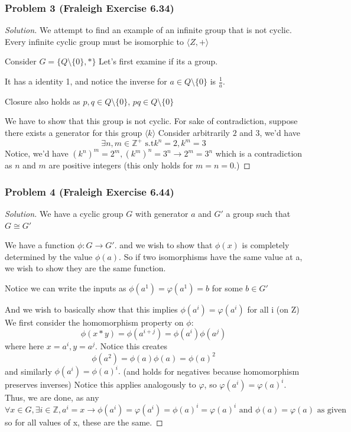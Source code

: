 \documentclass[11pt]{article}
\newcommand{\1}{\mathbf{1}}
\theoremstyle{definition}
\newenvironment{solution}{\begin{proof}[Solution]}{\end{proof}}
\begin{document}
\subsubsection*{Problem 3 (Fraleigh Exercise 6.34)}
\begin{solution}
We attempt to find an example of an infinite group that is not cyclic. Every infinite
cyclic group must be isomorphic to $\langle Z, +\rangle$
\par Consider $G = \{Q \setminus \{0\}, *\}$ Let's first examine if its a group.
\par It has a identity 1, and notice the inverse for $a \in Q \setminus\{0\}$
is $\frac{1}{a}.$
\par Closure also holds as $p, q \in Q \setminus \{0\}$, $pq \in Q\setminus\{0\}$
\par We have to show that this group is not cyclic. For sake of contradiction, suppose
there exists a generator for this group $\langle k\rangle$
Consider arbitrarily $2$ and $3$, we'd have $$\exists n, m \in \mathbb{Z}^{+} \text{ s.t
} k^n = 2, k^m = 3$$
Notice, we'd have $(k^n)^m = 2^m, (k^m)^n = 3^n \rightarrow 2^m = 3^n$ which is a
contradiction as $n$ and $m$ are positive integers (this only holds for $m = n  = 0.$)
\end{solution}
\subsubsection*{Problem 4 (Fraleigh Exercise 6.44)}
\begin{solution}
We have a cyclic group $G$ with generator $a$ and $G'$ a group such that $G \cong G'$
\par We have a function $\phi: G \rightarrow G'.$ and we wish to show that $\phi(x)$ is
completely determined by the value $\phi(a).$ So if two isomorphisms have the same value
at a, we wish to show they are the same function.
\par Notice we can write the inputs as $\phi(a^1) = \varphi(a^1)  = b$ for some $b \in G'$
\par And we wish to basically show that this implies $\phi(a^i) = \varphi(a^i)$ for all
i (on Z)
We first consider the homomorphism property on $\phi$: $$\phi(x * y) = \phi(a^{i + j})
= \phi(a^{i})\phi(a^{j})$$ where here $x = a^i, y = a^j.$
Notice this creates $$\phi(a^{2}) = \phi(a)\phi(a) = \phi(a)^2$$ and similarly
$\phi(a^i) = \phi(a)^i.$ (and holds for negatives because homomorphism preserves
inverses)
Notice this applies analogously to $\varphi$, so $\varphi(a^{i}) = \varphi(a)^i.$
Thus, we are done, as any $$\forall x \in G,\exists i \in \mathbb{Z},  a^{i} = x
\rightarrow \phi(a^i) = \varphi(a^i) = \phi(a)^i = \varphi(a)^i \text{ and } \phi(a) =
\varphi(a) \text{ as given }$$
so for all values of x, these are the same.

\end{solution}
\end{document}
